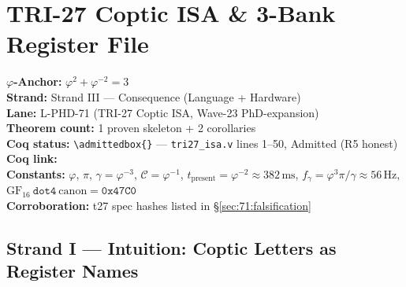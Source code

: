 
\chapter{TRI-27 Coptic ISA \& 3-Bank Register File}
\label{ch:71:tri27-coptic-isa}

\begin{tcolorbox}[colback=gold!5,colframe=gold!60,title=Chapter Anchor]
  \textbf{$\varphi$-Anchor:} $\varphi^2 + \varphi^{-2} = 3$ \\
  \textbf{Strand:} Strand III — Consequence (Language + Hardware) \\
  \textbf{Lane:} L-PHD-71 (TRI-27 Coptic ISA, Wave-23 PhD-expansion) \\
  \textbf{Theorem count:} 1 proven skeleton + 2 corollaries \\
  \textbf{Coq status:} \verb|\admittedbox{}| — \texttt{tri27\_isa.v} lines 1--50,
    Admitted (R5 honest) \\
  \textbf{Coq link:}  \\
  \textbf{Constants:} $\varphi$, $\pi$, $\gamma = \varphi^{-3}$,
    $\mathcal{C} = \varphi^{-1}$,
    $t_{\mathrm{present}} = \varphi^{-2} \approx 382\,\text{ms}$,
    $f_\gamma = \varphi^3\pi/\gamma \approx 56\,\text{Hz}$,
    $\mathrm{GF}_{16}\ \mathtt{dot4}\ \mathrm{canon} = \mathtt{0x47C0}$ \\
  \textbf{Corroboration:} t27 spec hashes listed in
    \S\ref{sec:71:falsification}
\end{tcolorbox}

\section{Strand I — Intuition: Coptic Letters as Register Names}
\label{sec:71:intuition}

